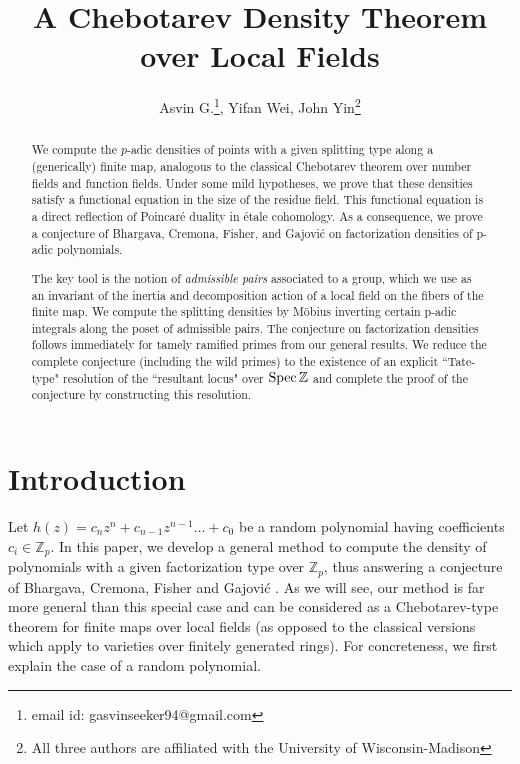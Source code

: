 \documentclass[10pt]{article}
\theoremstyle{plain}
\theoremstyle{definition}
\numberwithin{equation}{section}
\begin{document}
\title{A Chebotarev Density Theorem over Local Fields}
\author{Asvin G.\footnote{email id: gasvinseeker94@gmail.com}, Yifan Wei, John Yin\footnote{All three authors are affiliated with the University of Wisconsin-Madison}}
\maketitle

\begin{abstract}
    We compute the $p$-adic densities of points with a given splitting type along a (generically) finite map, analogous to the classical Chebotarev theorem over number fields and function fields. Under some mild hypotheses, we prove that these densities satisfy a functional equation in the size of the residue field. This functional equation is a direct reflection of Poincar\'e duality in \'etale cohomology. As a consequence, we prove a conjecture of Bhargava, Cremona, Fisher, and Gajovi\'c on factorization densities of p-adic polynomials. 
    
    The key tool is the notion of \emph{admissible pairs} associated to a group, which we use as an invariant of the inertia and decomposition action of a local field on the fibers of the finite map. We compute the splitting densities by M\"obius inverting certain p-adic integrals along the poset of admissible pairs. The conjecture on factorization densities follows immediately for tamely ramified primes from our general results. We reduce the complete conjecture (including the wild primes) to the existence of an explicit ``Tate-type" resolution of the ``resultant locus" over $\operatorname{Spec} \mathbb Z$ and complete the proof of the conjecture by constructing this resolution. 
\end{abstract}

\tableofcontents

\section{Introduction}

Let $h(z) = c_nz^n + c_{n-1}z^{n-1} \dots + c_0$ be a random polynomial having coefficients $ c_i \in \mathbb Z_p$. In this paper, we develop a general method to compute the density of polynomials with a given factorization type over $\mathbb Z_p$, thus answering a conjecture of Bhargava, Cremona, Fisher and Gajović \cite{bhargava2022density}. As we will see, our method is far more general than this special case and can be considered as a Chebotarev-type theorem for finite maps over local fields (as opposed to the classical versions which apply to varieties over finitely generated rings). For concreteness, we first explain the case of a random polynomial.
\end{document}
